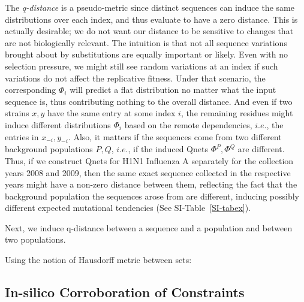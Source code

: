 \documentclass[onecolumn, compsoc,10pt]{IEEEtran}
\begin{document}
The \textit{q-distance} is a pseudo-metric since  distinct sequences can induce the same distributions over each index, and thus evaluate to have a zero distance. This is  actually desirable; we do not want our distance to be  sensitive to changes that are not biologically relevant. The intuition is that  not all sequence variations brought about by substitutions are equally important or likely. Even with no  selection pressure, we might still see random  variations at an index if such variations do not affect the replicative fitness. Under that scenario, the corresponding $\Phi_i$ will predict a flat distribution no matter what the input sequence is, thus contributing nothing to the overall distance. And even if two strains $x,y$ have the same entry at some index $i$, the remaining residues  might induce different distributions $\Phi_i$ based on the remote dependencies, $i.e.$, the entries in $x_{-i},y_{-i}$. Also, it matters if the sequences come from two different background populations $P,Q$, $i.e.$, if the induced Qnets $\Phi^P,\Phi^Q$ are different. Thus, if we construct Qnets for H1N1 Influenza A separately for the collection years 2008 and 2009, then the same exact sequence collected in the respective years might have a non-zero distance between them, reflecting the fact that the background population the sequences arose from are different, inducing possibly different expected mutational tendencies (See SI-Table~\ref{SI-tabex}).

Next, we induce q-distance  between a sequence and a population and between two populations.
\begin{defn}
Using the notion of Hausdorff metric between sets:
\end{defn}






\subsection*{In-silico Corroboration of \qnet Constraints}
\end{document}
